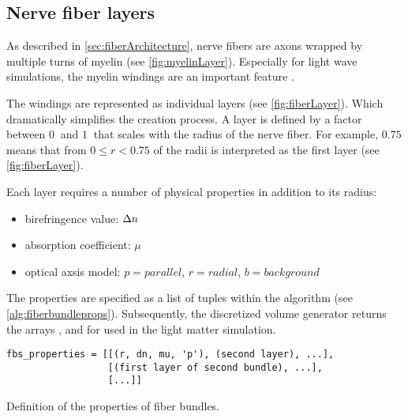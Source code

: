 \subsection{Nerve fiber layers}
%
As described in \cref{sec:fiberArchitecture}, nerve fibers are axons wrapped by multiple turns of myelin (see \cref{fig:myelinLayer}).
Especially for light wave simulations, the myelin windings are an important feature \cite{MenzelDissertation}.
\par
%
The windings are represented as individual layers (see \cref{fig:fiberLayer}).
Which dramatically simplifies the creation process.
A layer is defined by a factor between $\SI{0}{}$ and $\SI{1}{}$ that scales with the radius of the nerve fiber.
For example, $\SI{0.75}{}$ means that from $0 \leq r < 0.75$ of the radii is interpreted as the first layer (see \cref{fig:fiberLayer}).
\par
%
Each layer requires a number of physical properties in addition to its radius:
%
\begin{itemize}[nosep]
    \item birefringence value: $\textnormal{$\Delta n$}$
    \item absorption coefficient: $\mu$
    \item optical axsis model: $p=\mathit{parallel}$, $r=\mathit{radial}$, $b=\mathit{background}$
\end{itemize}
%
The properties are specified as a list of tuples within the algorithm (see \cref{alg:fiberbundleprops}).
Subsequently, the discretized volume generator returns the arrays \tissue{}, \opticalaxis{} and \propertylist{} for used in the light matter simulation.
% 
\begin{lstfloat}[!ht]
\lstset{style=python}
\begin{lstlisting}[]
fbs_properties = [[(r, dn, mu, 'p'), (second layer), ...],
                  [(first layer of second bundle), ...],
                  [...]]
\end{lstlisting}
\caption{Definition of the properties of fiber bundles.}
\label{alg:fiberbundleprops}
\end{lstfloat}
% 
% 
% 
